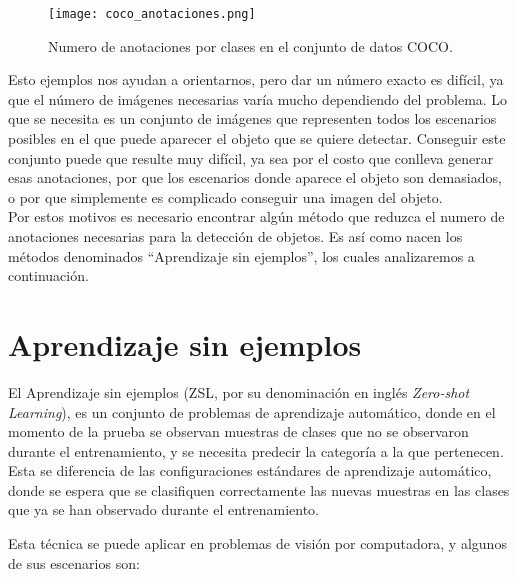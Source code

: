 \begin{figure}
	\centering
	\texttt{[image: coco\_anotaciones.png]}
	\caption{Numero de anotaciones por clases en el conjunto de datos COCO.}
	\label{fig:COCOAnotaciones}
\end{figure}

Esto ejemplos nos ayudan a orientarnos, pero dar un número exacto es difícil, ya que el número de imágenes necesarias varía mucho dependiendo del problema. Lo que se necesita es un conjunto de imágenes que representen todos los escenarios posibles en el que puede aparecer el objeto que se quiere detectar. Conseguir este conjunto puede que resulte muy difícil, ya sea por el costo que conlleva generar esas anotaciones, por que los escenarios donde aparece el objeto son demasiados, o por que simplemente es complicado conseguir una imagen del objeto.\\

Por estos motivos es necesario encontrar algún método que reduzca el numero de anotaciones necesarias para la detección de objetos. Es así como nacen los métodos denominados ``Aprendizaje sin ejemplos'', los cuales analizaremos a continuación.
 
\section{Aprendizaje sin ejemplos} \label{sec:aprendizajesinejemplos}
El Aprendizaje sin ejemplos (ZSL, por su denominación en inglés \textit{Zero-shot Learning}), es un conjunto de problemas de aprendizaje automático, donde en el momento de la prueba se observan muestras de clases que no se observaron durante el entrenamiento, y se necesita predecir la categoría a la que pertenecen. Esta se diferencia de las configuraciones estándares de aprendizaje automático, donde se espera que se clasifiquen correctamente las nuevas muestras en las clases que ya se han observado durante el entrenamiento. 

Esta técnica se puede aplicar en problemas de visión por computadora, y algunos de sus escenarios son:

